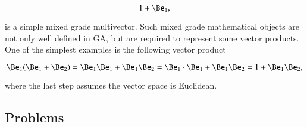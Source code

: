 \begin{dmath}\label{eqn:multivector:240}
1 + \Be_1,
\end{dmath}

is a simple mixed grade multivector.
Such mixed grade mathematical objects are not only well defined in GA, but are required to represent some vector products.  One of the simplest examples is the following vector product

\begin{dmath}\label{eqn:multivector:260}
\Be_1 ( \Be_1 + \Be_2 )
=
\Be_1 \Be_1 + \Be_1 \Be_2
=
\Be_1 \cdot \Be_1 + \Be_1 \Be_2
=
1 + \Be_1 \Be_2,
\end{dmath}

where the last step assumes the vector space is Euclidean.

\subsection{Problems}



